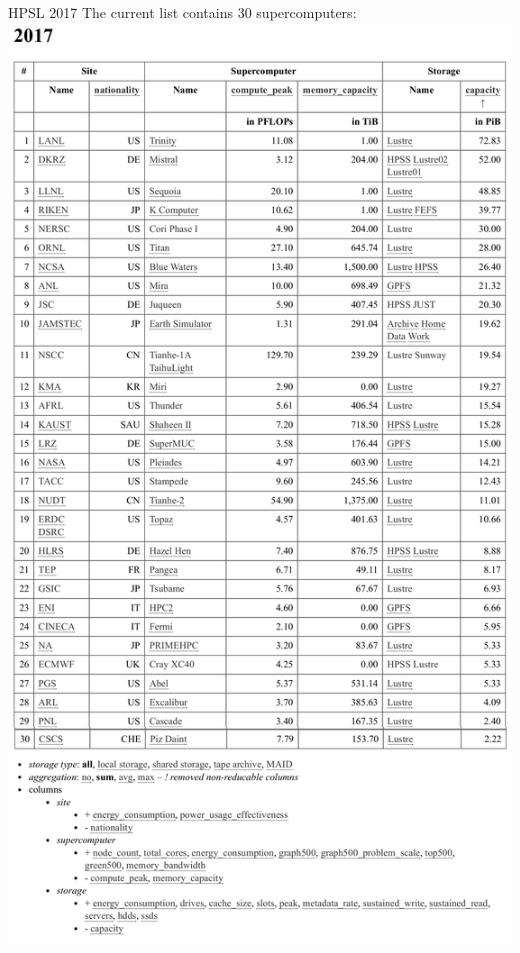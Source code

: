 \documentclass[portrait,a0paper,fontscale=0.4]{baposter}
\begin{document}
\begin{poster}
\begin{posterbox}[name=engineering,column=3]{HPSL 2017}
The current list contains 30 supercomputers:
\includegraphics[width=\textwidth]{hpsl-current}


\end{posterbox}
\end{poster}
\end{document}

